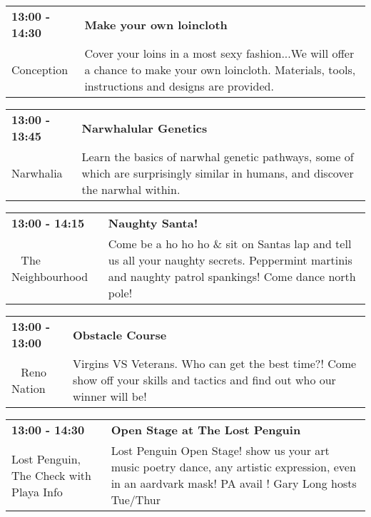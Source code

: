 \begin{tabular}{ p{1in} p{2.2in} }
    \textbf{13:00 - 14:30} & \textbf{Make your own loincloth} \\
    Conception \newline  & Cover your loins in a most sexy fashion...We will offer a chance to make your own loincloth.  Materials, tools, instructions and designs are provided. \\
    \hline 
\end{tabular}
    
\begin{tabular}{ p{1in} p{2.2in} }
    \textbf{13:00 - 13:45} & \textbf{Narwhalular Genetics} \\
    Narwhalia \newline  & Learn the basics of narwhal genetic pathways, some of which are surprisingly similar in humans, and discover the narwhal within. \\
    \hline 
\end{tabular}
    
\begin{tabular}{ p{1in} p{2.2in} }
    \textbf{13:00 - 14:15} & \textbf{ Naughty Santa!} \\
    ~ \newline The Neighbourhood & Come be a ho ho ho \&  sit on Santas lap and tell us all your naughty secrets. Peppermint martinis and naughty patrol spankings! Come dance north pole! \\
    \hline 
\end{tabular}
    
\begin{tabular}{ p{1in} p{2.2in} }
    \textbf{13:00 - 13:00} & \textbf{Obstacle Course} \\
    ~ \newline Reno Nation & Virgins VS Veterans. Who can get the best time?! Come show off your skills and tactics and find out who our winner will be! \\
    \hline 
\end{tabular}
    
\begin{tabular}{ p{1in} p{2.2in} }
    \textbf{13:00 - 14:30} & \textbf{Open Stage at The Lost Penguin} \\
    Lost Penguin, The \newline  Check with Playa Info & Lost Penguin Open Stage! show us your art music poetry dance, any artistic expression, even in an aardvark mask! PA avail !  Gary Long hosts Tue/Thur \\
    \hline 
\end{tabular}
    
